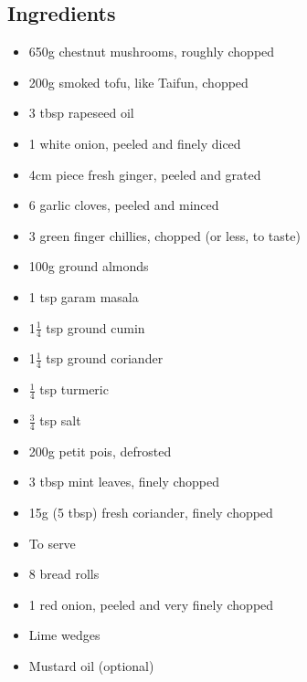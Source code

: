 \documentclass{book}
\begin{document}
\subsection*{Ingredients}
\begin{itemize}
\item 650g chestnut mushrooms, roughly chopped
\item 200g smoked tofu, like Taifun, chopped
\item 3 tbsp rapeseed oil
\item 1 white onion, peeled and finely diced
\item 4cm piece fresh ginger, peeled and grated
\item 6 garlic cloves, peeled and minced
\item 3 green finger chillies, chopped (or less, to taste)
\item 100g ground almonds
\item 1 tsp garam masala
\item 1$\frac{1}{4}$ tsp ground cumin
\item 1$\frac{1}{4}$ tsp ground coriander
\item $\frac{1}{4}$ tsp turmeric
\item $\frac{3}{4}$ tsp salt
\item 200g petit pois, defrosted
\item 3 tbsp mint leaves, finely chopped
\item 15g (5 tbsp) fresh coriander, finely chopped
\end{itemize}

\begin{itemize}
\item To serve
\item 8 bread rolls
\item 1 red onion, peeled and very finely chopped
\item Lime wedges 
\item Mustard oil (optional)
\end{itemize}
\end{document}
